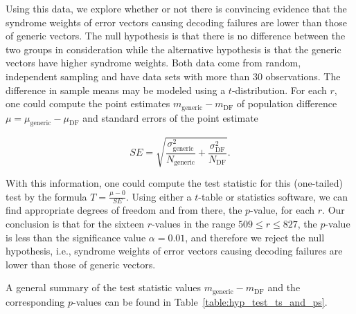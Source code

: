 Using this data, we explore whether or not there is convincing evidence that the syndrome weights of error vectors causing decoding failures are lower than those of generic vectors. The null hypothesis is that there is no difference between the two groups in consideration while the alternative hypothesis is that the generic vectors have higher syndrome weights. Both data come from random, independent sampling and have data sets with more than 30 observations. The difference in sample means may be modeled using a $t$-distribution. For each $r$, one could compute the point estimates $m_{\text{generic}} - m_{\text{DF}}$ of population difference $\mu = \mu_{\text{generic}} - \mu_{\text{DF}}$ and standard errors of the point estimate 

$$SE = \sqrt{\frac{\sigma_{\text{generic}}^2}{N_{\text{generic}} } +\frac{\sigma_{\text{DF}}^2}{N_{\text{DF}} } }.$$

With this information, one could compute the test statistic for this (one-tailed) test by the formula $T = \frac{\mu - 0}{SE}$. Using either a $t$-table or statistics software, we can find appropriate degrees of freedom and from there, the $p$-value, for each $r$. Our conclusion is that for the sixteen $r$-values in the range $509 \leq r \leq 827$, the $p$-value is less than the significance value $\alpha = 0.01$, and therefore we reject the null hypothesis, i.e., syndrome weights of error vectors causing decoding failures are lower than those of generic vectors.

A general summary of the test statistic values $m_{\text{generic}} - m_{\text{DF}}$ and the corresponding $p$-values can be found in Table~\ref{table:hyp_test_ts_and_ps}.

